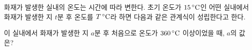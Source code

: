 화재가 발생한 실내의 온도는 시간에 따라 변한다. 초기 온도가 $15\mkern3mu ^{\circ}\mathrm{C}$인 어떤 실내에서 화재가 발생한 지 $t$분 후 온도를 $T\mkern3mu ^{\circ}\mathrm{C}$라 하면 다음과 같은 관계식이 성립한다고 한다.\par\smallskip{}\par\smallskip\noindent 이 실내에서 화재가 발생한 지 $a$분 후 처음으로 온도가 $360\mkern3mu ^{\circ}\mathrm{C}$ 이상이었을 때, $a$의 값은?
